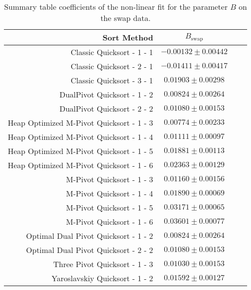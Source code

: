 	\begin{table}
		\begin{center}
			\begin{tabular}{|r|c|c|c}
				\hline
								Sort Method              &   $B_{\text{swap}}$      \\ \hline \hline
				                Classic Quicksort - 1 - 1 &   $ -0.00132 \pm  0.00442$ \\ \hline
				                Classic Quicksort - 2 - 1 &   $ -0.01411 \pm  0.00417$ \\ \hline
				                Classic Quicksort - 3 - 1 &   $  0.01903 \pm  0.00298$ \\ \hline
				              DualPivot Quicksort - 1 - 2 &   $  0.00824 \pm  0.00264$ \\ \hline
				              DualPivot Quicksort - 2 - 2 &   $  0.01080 \pm  0.00153$ \\ \hline
				 Heap Optimized M-Pivot Quicksort - 1 - 3 &   $  0.00774 \pm  0.00233$ \\ \hline
				 Heap Optimized M-Pivot Quicksort - 1 - 4 &   $  0.01111 \pm  0.00097$ \\ \hline
				 Heap Optimized M-Pivot Quicksort - 1 - 5 &   $  0.01881 \pm  0.00113$ \\ \hline
				 Heap Optimized M-Pivot Quicksort - 1 - 6 &   $  0.02363 \pm  0.00129$ \\ \hline
				                M-Pivot Quicksort - 1 - 3 &   $  0.01160 \pm  0.00156$ \\ \hline
				                M-Pivot Quicksort - 1 - 4 &   $  0.01890 \pm  0.00069$ \\ \hline
				                M-Pivot Quicksort - 1 - 5 &   $  0.03171 \pm  0.00065$ \\ \hline
				                M-Pivot Quicksort - 1 - 6 &   $  0.03601 \pm  0.00077$ \\ \hline
				     Optimal Dual Pivot Quicksort - 1 - 2 &   $  0.00824 \pm  0.00264$ \\ \hline
				     Optimal Dual Pivot Quicksort - 2 - 2 &   $  0.01080 \pm  0.00153$ \\ \hline
				            Three Pivot Quicksort - 1 - 3 &   $  0.01030 \pm  0.00153$ \\ \hline
				           Yaroslavskiy Quicksort - 1 - 2 &   $  0.01592 \pm  0.00127$ \\ \hline
			\end{tabular}
			\caption{Summary table coefficients of the non-linear fit for the parameter $B$ on the swap data.}
			\label{tab:swapFitCoeffB}
		\end{center}
	\end{table}

